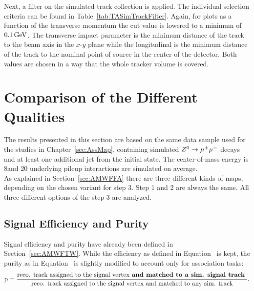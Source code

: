 

Next, a filter on the simulated track collection is applied. The individual selection criteria can be found in Table~\ref{tab:TASimTrackFilter}. Again, for plots as a function of the transverse momentum the cut value is lowered to a minimum \pt{} of $0.1\,\text{Ge\hspace{-.08em}V}$. The transverse impact parameter is the minimum distance of the track to the beam axis in the $x$-$y$ plane while the longitudinal is the minimum distance of the track to the nominal point of source in the center of the detector. Both values are chosen in a way that the whole tracker volume is covered.



\section{Comparison of the Different Qualities \label{sec:TASEFRDQ}}

The results presented in this section are based on the same data sample used for the studies in Chapter~\ref{sec:AssMap}, containing simulated ${Z^{0}}\rightarrow\mu^+\mu^-$ decays and at least one additional jet from the initial state. The center-of-mass energy is 8\TeV and 20 underlying pileup interactions are simulated on average. \\
As explained in Section~\ref{sec:AMWFFA} there are three different kinds of maps, depending on the chosen variant for step 3. Step 1 and 2 are always the same. All three different options of the step 3 are analyzed.

\subsection{Signal Efficiency and Purity \label{sec:TASEFR}}

Signal efficiency and purity have already been defined in Section~\ref{sec:AMWFTW}. While the efficiency as defined in Equation~ is kept, the purity as in Equation~ is slightly modified to account only for association tasks:
\begin{equation}
    \textrm{p} = \frac{ \textrm{reco. track assigned to the signal vertex \textbf{and matched to a sim. signal track} } }{ \textrm{reco. track assigned to the signal vertex and matched to any sim. track} }.
    \label{eq:AssPurity}
\end{equation}

